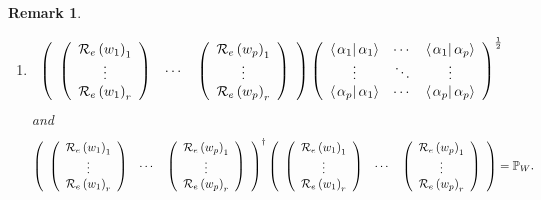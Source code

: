 \documentclass[aps,preprint]{revtex4}%
\newtheorem{remark}[theorem]{Remark}
\begin{document}
\begin{remark}
\begin{enumerate}
\begin{enumerate}
\item
\begin{equation}
\left(
\begin{array}
[c]{ccc}%
\left(
\begin{array}
[c]{c}%
\mathcal{R}_{e}\left(  w_{1}\right)  _{1}\\
\vdots\\
\mathcal{R}_{e}\left(  w_{1}\right)  _{r}%
\end{array}
\right)  & \cdots & \left(
\begin{array}
[c]{c}%
\mathcal{R}_{e}\left(  w_{p}\right)  _{1}\\
\vdots\\
\mathcal{R}_{e}\left(  w_{p}\right)  _{r}%
\end{array}
\right)
\end{array}
\right)  \left(
\begin{array}
[c]{ccc}%
\left\langle \left.  \alpha_{1}\right\vert \alpha_{1}\right\rangle  & \cdots &
\left\langle \left.  \alpha_{1}\right\vert \alpha_{p}\right\rangle \\
\vdots & \ddots & \vdots\\
\left\langle \left.  \alpha_{p}\right\vert \alpha_{1}\right\rangle  & \cdots &
\left\langle \left.  \alpha_{p}\right\vert \alpha_{p}\right\rangle
\end{array}
\right)  ^{\frac{1}{2}}%
\end{equation}
and
\begin{equation}
\left(
\begin{array}
[c]{ccc}%
\left(
\begin{array}
[c]{c}%
\mathcal{R}_{e}\left(  w_{1}\right)  _{1}\\
\vdots\\
\mathcal{R}_{e}\left(  w_{1}\right)  _{r}%
\end{array}
\right)  & \cdots & \left(
\begin{array}
[c]{c}%
\mathcal{R}_{e}\left(  w_{p}\right)  _{1}\\
\vdots\\
\mathcal{R}_{e}\left(  w_{p}\right)  _{r}%
\end{array}
\right)
\end{array}
\right)  ^{\dagger}\left(
\begin{array}
[c]{ccc}%
\left(
\begin{array}
[c]{c}%
\mathcal{R}_{e}\left(  w_{1}\right)  _{1}\\
\vdots\\
\mathcal{R}_{e}\left(  w_{1}\right)  _{r}%
\end{array}
\right)  & \cdots & \left(
\begin{array}
[c]{c}%
\mathcal{R}_{e}\left(  w_{p}\right)  _{1}\\
\vdots\\
\mathcal{R}_{e}\left(  w_{p}\right)  _{r}%
\end{array}
\right)
\end{array}
\right)  =\mathbb{P}_{W}.
\end{equation}



\end{enumerate}
\end{enumerate}
\end{remark}
\end{document}
